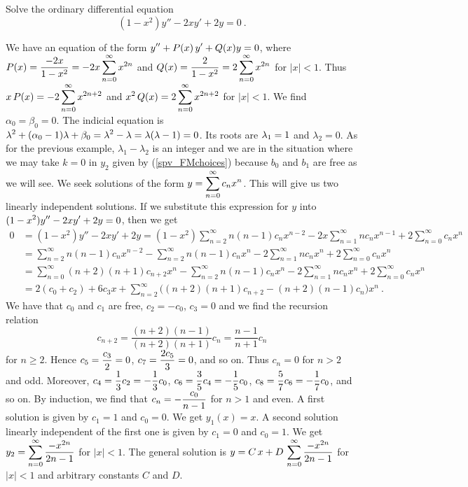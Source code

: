 \begin{egg}
Solve the ordinary differential equation
\[
(1-x^2)y''- 2x y' + 2y = 0 \ .
\]

We have an equation of the form
$\displaystyle y'' + P(x)\, y' + Q(x) y = 0$, where
$\displaystyle P(x) = \frac{-2x}{1-x^2} = -2x \sum_{n=0}^\infty x^{2n}$
and
$\displaystyle Q(x) = \frac{2}{1-x^2} = 2 \sum_{n=0}^\infty x^{2n}$
for $|x|<1$.  Thus
$\displaystyle x\,P(x) = -2 \sum_{n=0}^\infty x^{2n+2}$ and
$\displaystyle x^2\,Q(x) = 2\sum_{n=0}^\infty x^{2n+2}$
for $|x|<1$.  We find $\alpha_0 = \beta_0= 0$.  The indicial equation is
$\displaystyle \lambda^2 + (\alpha_0 - 1)\lambda + \beta_0 = \lambda^2
- \lambda  = \lambda (\lambda -1) = 0$.
Its roots are $\displaystyle \lambda_1 = 1$ and $\lambda_2=0$.
As for the previous example, $\lambda_1-\lambda_2$ is an integer and
we are in the situation where we may take $k=0$ in $y_2$ given by
(\ref{spv_FMchoices}) because $b_0$ and $b_1$ are free as we will see.
We seek solutions of the form
$\displaystyle y = \sum_{n=0}^\infty c_n x^n$.  This will give us
two linearly independent solutions.  If we substitute this
expression for $y$ into $\displaystyle (1-x^2)y''- 2x y' + 2y = 0$,
then we get
\begin{align*}
0 & = (1-x^2)y''- 2x y' + 2y
= (1-x^2) \sum_{n=2}^\infty n(n-1) c_n
x^{n-2} - 2 x \sum_{n=1}^\infty n c_n x^{n-1}
+ 2 \sum_{n=0}^\infty c_n x^n \\
&= \sum_{n=2}^\infty n(n-1) c_n x^{n-2}
- \sum_{n=2}^\infty n(n-1) c_n x^n -2 \sum_{n=1}^\infty n c_n x^n
+ 2\sum_{n=0}^\infty c_n x^n \\
&= \sum_{n=0}^\infty (n+2)(n+1) c_{n+2} x^n
- \sum_{n=2}^\infty n(n-1) c_n x^n -2 \sum_{n=1}^\infty n c_n x^n
+ 2\sum_{n=0}^\infty c_n x^n \\
&= 2 (c_0+c_2) + 6 c_3 x + \sum_{n=2}^\infty \big( (n+2)(n+1) c_{n+2} 
- (n+2)(n-1) c_n \big) x^n \ .
\end{align*}
We have that $c_0$ and $c_1$ are free, $c_2 = -c_0$, $c_3 =0$ and we
find the recursion relation
\[
c_{n+2}  = \frac{(n+2)(n-1)}{(n+2)(n+1)} c_n = \frac{n-1}{n+1} c_n
\]
for $n\geq 2$.  Hence
$\displaystyle c_5 = \frac{c_3}{2} = 0$,
$\displaystyle c_7 = \frac{2c_5}{3} = 0$, and so on.
Thus $c_n = 0$ for $n>2$ and odd.  Moreover,
$\displaystyle c_4 = \frac{1}{3} c_2 = - \frac{1}{3} c_0$,
$\displaystyle c_6 = \frac{3}{5} c_4 = - \frac{1}{5} c_0$,
$\displaystyle c_8 = \frac{5}{7} c_6 = - \frac{1}{7} c_0$, and so on.
By induction, we find that
$\displaystyle c_n = - \frac{c_0}{n-1}$ for $n>1$ and even.
A first solution is given by $c_1=1$ and $c_0=0$.  We get
$y_1(x) = x$.  A second solution linearly independent of the first one
is given by $c_1=0$ and $c_0=1$.  We get
$\displaystyle y_2 = \sum_{n=0}^\infty \frac{-x^{2n}}{2n-1}$
for $|x|<1$.  The general solution is
$\displaystyle y = C\, x + D\,\sum_{n=0}^\infty \frac{-x^{2n}}{2n-1}$
for $|x|<1$ and arbitrary constants $C$ and $D$.
\end{egg}


